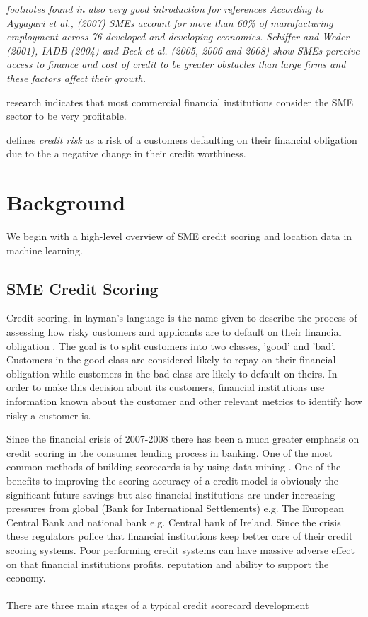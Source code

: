 \textit{footnotes found in \citep{rocha_status_2011} also very good introduction for references
According to Ayyagari et al., (2007) SMEs account for more than 60\% of manufacturing employment across 76
developed and developing economies. 
Schiffer and Weder (2001), IADB (2004) and Beck et al. (2005, 2006 and 2008) show SMEs perceive access to
finance and cost of credit to be greater obstacles than large firms and these factors affect their growth.
}


\cite{beck_bank_2008} research indicates that most commercial financial institutions consider the SME sector to be very profitable. 


\cite{anderson_credit_2007} defines \textit{credit risk} as a risk of a customers defaulting on their financial obligation due to the a negative change in their credit worthiness.


\section{Background}

We begin with a high-level overview of SME credit scoring and location data in machine learning.

\subsection{SME Credit Scoring}

Credit scoring, in layman's language is the name given to describe the process of assessing how risky customers and applicants are to default on their financial obligation \citep{hand_statistical_1997}. The goal is to split customers into two classes, 'good' and 'bad'. Customers in the good class are considered likely to repay on their financial obligation while customers in the bad class are likely to default on theirs. In order to make this decision about its customers, financial institutions use information known about the customer and other relevant metrics to identify how risky a customer is. 


Since the financial crisis of 2007-2008 there has been a  much greater emphasis on credit scoring in the consumer lending process in banking. One of the most common methods of building scorecards is by using data mining \citep{baesens_50_2009}. One of the benefits to improving the scoring accuracy of a credit model is obviously the significant future savings \citep{west_neural_2000} but also financial institutions are under increasing pressures from global (Bank for International Settlements) e.g. The European Central Bank and national bank e.g. Central bank of Ireland. Since the crisis these regulators police that financial institutions keep better care of their credit scoring systems. Poor performing credit systems can have massive adverse effect on that financial institutions profits, reputation and  ability to support the economy.
\\\\
There are three main stages of a typical credit scorecard development \cite{van_gestel_credit_2009}

